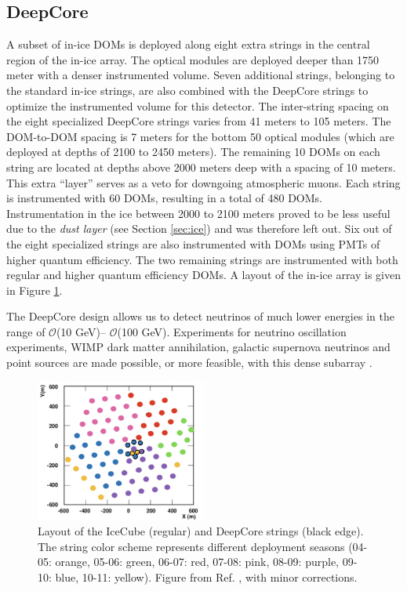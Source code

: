 \subsection{DeepCore}
\label{subsec:DC}
A subset of in-ice DOMs is deployed along eight extra strings in the central region of the in-ice array. The optical modules are deployed deeper than 1750 meter with a denser instrumented volume. Seven additional strings, belonging to the standard in-ice strings, are also combined with the DeepCore strings to optimize the instrumented volume for this detector. The inter-string spacing on the eight specialized DeepCore strings varies from 41 meters to 105 meters. The DOM-to-DOM spacing is 7 meters for the bottom 50 optical modules (which are deployed at depths of 2100 to 2450 meters). The remaining 10 DOMs on each string are located at depths above 2000 meters deep with a spacing of 10 meters. This extra ``layer'' serves as a veto for downgoing atmospheric muons. Each string is instrumented with 60 DOMs, resulting in a total of 480 DOMs. Instrumentation in the ice between 2000 to 2100 meters proved to be less useful due to the \textit{dust layer} (see Section \ref{sec:ice}) and was therefore left out. Six out of the eight specialized strings are also instrumented with DOMs using PMTs of higher quantum efficiency. The two remaining strings are instrumented with both regular and higher quantum efficiency DOMs. A layout of the in-ice array is given in Figure \ref{fig:layoutIC}.

The DeepCore design allows us to detect neutrinos of much lower energies in the range of $\mathcal{O}$(10 GeV)– $\mathcal{O}$(100 GeV). Experiments for neutrino oscillation experiments, WIMP dark matter annihilation, galactic supernova neutrinos and point sources are made possible, or more feasible, with this dense subarray \cite{Collaboration:2011ym}.

\begin{figure}[t]
\centering
\includegraphics[width=0.5\textwidth]{chapter5/img/layoutIC.png}
\caption{Layout of the IceCube (regular) and DeepCore strings (black edge). The string color scheme represents different deployment seasons (04-05: orange, 05-06: green, 06-07: red, 07-08: pink, 08-09: purple, 09-10: blue, 10-11: yellow). Figure from Ref. \cite{Choma:2018zbe}, with minor corrections.}
\label{fig:layoutIC}
\end{figure}

